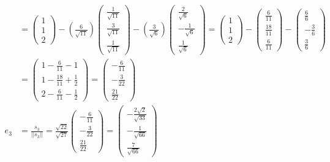 \documentclass[fleqn]{article}
\begin{document}
\begin{equation*}
\begin{split}
    &= \begin{pmatrix}1\\1\\2\end{pmatrix} - (\frac{6}{\sqrt{11}})\begin{pmatrix}\frac{1}{\sqrt{11}}\\\frac{3}{\sqrt{11}}\\\frac{1}{\sqrt{11}}\end{pmatrix}-(\frac{3}{\sqrt{6}})\begin{pmatrix}\frac{2}{\sqrt{6}}\\-\frac{1}{\sqrt{6}}\\\frac{1}{\sqrt{6}}\end{pmatrix}=\begin{pmatrix}1\\1\\2\end{pmatrix}-\begin{pmatrix}\frac{6}{11}\\\frac{18}{11}\\\frac{6}{11}\end{pmatrix}-\begin{pmatrix}\frac{6}{6}\\-\frac{3}{6}\\\frac{3}{6}\end{pmatrix}\\
    &= \begin{pmatrix}1-\frac{6}{11}-1\\1-\frac{18}{11}+\frac{1}{2}\\2-\frac{6}{11}-\frac{1}{2}\end{pmatrix}=\begin{pmatrix}-\frac{6}{11}\\-\frac{3}{22}\\\frac{21}{22}\end{pmatrix}\\
    e_3&=\frac{s_3}{||s_3||}=\frac{\sqrt{22}}{\sqrt{27}}\begin{pmatrix}-\frac{6}{11}\\-\frac{3}{22}\\\frac{21}{22}\end{pmatrix}=\begin{pmatrix}-\frac{2\sqrt{2}}{\sqrt{33}}\\-\frac{1}{\sqrt{66}}\\\frac{7}{\sqrt{66}}\end{pmatrix}
    \end{split}
\end{equation*}
\end{document}
